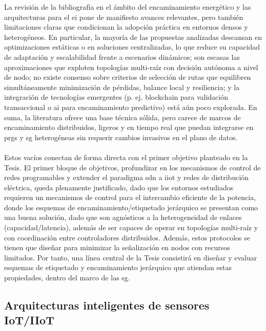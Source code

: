 La revisión de la bibliografía en el ámbito del encaminamiento energético y las arquitecturas para el \gls{ei} pone de manifiesto avances relevantes, pero también limitaciones claras que condicionan la adopción práctica en entornos densos y heterogéneos. En particular, la mayoría de las propuestas analizadas descansan en optimizaciones estáticas o en soluciones centralizadas, lo que reduce su capacidad de adaptación y escalabilidad frente a escenarios dinámicos; son escasas las aproximaciones que exploten topologías multi-raíz con decisión autónoma a nivel de nodo; no existe consenso sobre criterios de selección de rutas que equilibren simultáneamente minimización de pérdidas, balance local y resiliencia; y la integración de tecnologías emergentes (p. ej. blockchain para validación transaccional o \gls{ai} para encaminamiento predictivo) está aún poco explorada. En suma, la literatura ofrece una base técnica sólida, pero carece de marcos de encaminamiento distribuidos, ligeros y en tiempo real que puedan integrarse en \glspl{prg} y \gls{sg} heterogéneas sin requerir cambios invasivos en el plano de datos.\\
\\
Estos vacíos conectan de forma directa con el primer objetivo planteado en la Tesis. El primer bloque de objetivos, profundizar en los mecanismos de control de redes programables y extender el paradigma \gls{sdn} a \gls{iiot} y redes de distribución eléctrica, queda plenamente justificado, dado que los entornos estudiados requieren un mecanismos de control para el intercambio eficiente de la potencia, donde los esquemas de encaminamiento/etiquetado jerárquico se presentan como una buena solución, dado que son agnósticos a la heterogeneidad de enlaces (capacidad/latencia), además de ser capaces de operar en topologías multi-raíz y con coordinación entre controladores distribuidos. Además, estos protocolos se tienen que diseñar para minimizar la señalización en nodos con recursos limitados. Por tanto, una línea central de la Tesis consistirá en diseñar y evaluar esquemas de etiquetado y encaminamiento jerárquico que atiendan estas propiedades, dentro del marco de las \gls{sg}.



\subsection{Arquitecturas inteligentes de sensores IoT/IIoT}
\label{subsec:iiotarch}

